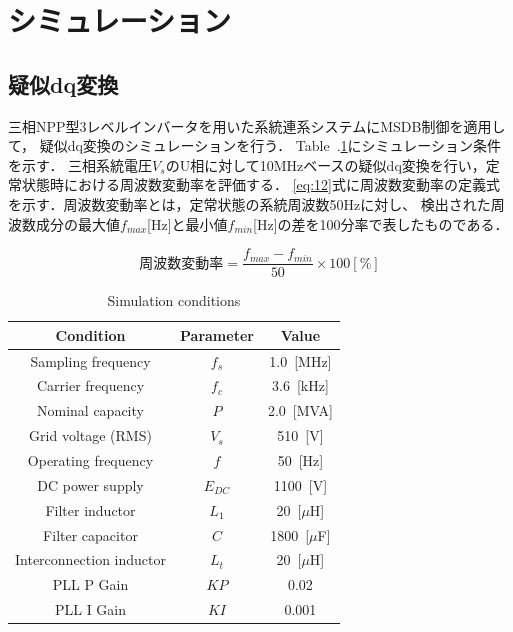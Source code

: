 \section{シミュレーション}

\subsection{疑似dq変換}
三相NPP型3レベルインバータを用いた系統連系システムにMSDB制御を適用して，
疑似dq変換のシミュレーションを行う．
Table~.\ref{tab:grid}にシミュレーション条件を示す．
三相系統電圧$V_s$のU相に対して10MHzベースの疑似dq変換を行い，定常状態時における周波数変動率を評価する．
\eqref{eq:12}式に周波数変動率の定義式を示す．周波数変動率とは，定常状態の系統周波数50Hzに対し、
検出された周波数成分の最大値$f_{max}$[Hz]と最小値$f_{min}$[Hz]の差を100分率で表したものである\cite{ref07}．

\begin{equation}
周波数変動率 = \frac{f_{max}-f_{min}}{50}×100 [\%]\label{eq:12} 
\end{equation}


\begin{table}[htbp]
  \centering
  \captionsetup{labelsep=space, name=Table.,skip = 0pt}
  \caption{Simulation conditions}
  \label{tab:grid}
  \begin{tabular}{c|c|c}
    \hline \hline
    Condition & Parameter & Value \\ \hline
    Sampling frequency        & $f_s$   & 1.0~[MHz] \\\hline
    Carrier frequency         & $f_c$   & 3.6~[kHz] \\\hline
    Nominal capacity          & $P$     & 2.0~[MVA] \\\hline
    Grid voltage (RMS)        & $V_s$   & 510~[V] \\\hline
    Operating frequency       & $f$     & 50~[Hz] \\\hline
    DC power supply           & $E_{DC}$& 1100~[V] \\\hline
    Filter inductor           & $L_1$   & 20~[$\mu$H] \\\hline
    Filter capacitor          & $C$     & 1800~[$\mu$F] \\\hline
    Interconnection inductor  & $L_t$   & 20~[$\mu$H] \\\hline
    PLL P Gain                & $KP$    & 0.02  \\\hline
    PLL I Gain                & $KI$    & 0.001 \\\hline
  \end{tabular}
\end{table}



